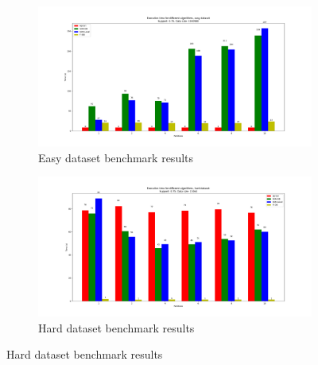 \documentclass[a4paper]{article}
\begin{document}
	
	\begin{figure}[h]
		\centering
		\begin{subfigure}[b]{0.45\textwidth}
			\centering
			\includegraphics[width=\textwidth]{1_easy_0,75_1_partitions.png}
         	\caption{Easy dataset benchmark results}
         	\label{fig:1-075sup-1ds-par-e}
		\end{subfigure}
		\hfill		
		\begin{subfigure}[b]{0.45\textwidth}
			\centering
			\includegraphics[width=\textwidth]{1_hard_0,75_1_partitions.png}
         	\caption{Hard dataset benchmark results}
         	\label{fig:1-075sup-1ds-par-h}
		\end{subfigure}
		\hfill
		
	\end{figure}
	
\end{document}
